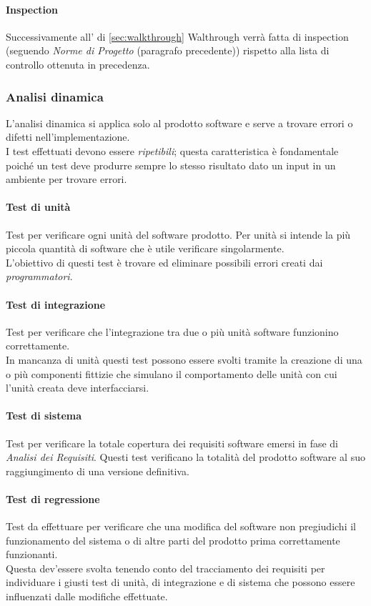 \documentclass{scalatekids-article}
\begin{document}
\paragraph{Inspection}
\label{sec:inspection}Successivamente all' di \ref{sec:walkthrough} {Walthrough} verrà fatta  di inspection (seguendo \textit{Norme di Progetto} (paragrafo precedente)) rispetto alla lista di controllo ottenuta in precedenza.
\subsubsection{Analisi dinamica}
L'analisi dinamica si applica solo al prodotto software e serve a trovare errori o difetti nell'implementazione.\\I test effettuati devono essere \textit{ripetibili}; questa caratteristica è fondamentale poiché un test deve produrre sempre lo stesso risultato dato un input in un ambiente per trovare errori.
\paragraph{Test di unità}
Test per verificare ogni unità del software prodotto. Per unità si intende la più piccola quantità di software che è utile verificare singolarmente.\\L'obiettivo di questi test è trovare ed eliminare possibili errori creati dai \textit{programmatori}.
\paragraph{Test di integrazione}
Test per verificare che l'integrazione tra due o più unità software funzionino correttamente.\\In mancanza di unità questi test possono essere svolti tramite la creazione di una o più componenti fittizie che simulano il comportamento delle unità con cui l'unità creata deve interfacciarsi.
\paragraph{Test di sistema}
Test per verificare la totale copertura dei requisiti software emersi in fase di \textit{Analisi dei Requisiti}. Questi test verificano la totalità del prodotto software al suo raggiungimento di una versione definitiva.
\paragraph{Test di regressione}
Test da effettuare per verificare che una modifica del software non pregiudichi il funzionamento del sistema o di altre parti del prodotto prima correttamente funzionanti.\\
Questa  dev'essere svolta tenendo conto del tracciamento dei requisiti per individuare i giusti test di unità, di integrazione e di sistema che possono essere influenzati dalle modifiche effettuate.\\
\end{document}
